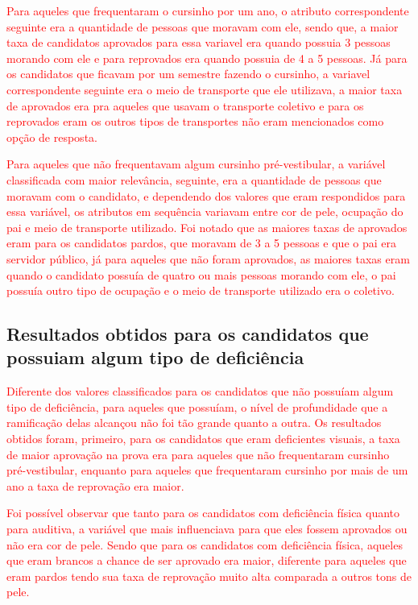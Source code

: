 \par
\textcolor{red}{Para aqueles que frequentaram o cursinho por um ano, o atributo correspondente seguinte era a quantidade de pessoas que moravam com ele, sendo que, a maior taxa de candidatos aprovados para essa variavel era quando possuia 3 pessoas morando com ele e para reprovados era quando possuia de 4 a 5 pessoas. Já para os candidatos que ficavam por um semestre fazendo o cursinho, a variavel correspondente seguinte era o meio de transporte que ele utilizava, a maior taxa de aprovados era pra aqueles que usavam o transporte coletivo e para os reprovados eram os outros tipos de transportes não eram mencionados como opção de resposta.}

\par
\textcolor{red}{Para aqueles que não frequentavam algum cursinho pré-vestibular, a variável classificada com maior relevância, seguinte, era a quantidade de pessoas que moravam com o candidato, e dependendo dos valores que eram respondidos para essa variável, os atributos em sequência variavam entre cor de pele, ocupação do pai e meio de transporte utilizado. Foi notado que as maiores taxas de aprovados eram para os candidatos pardos, que moravam de 3 a 5 pessoas e que o pai era servidor público, já para aqueles que não foram aprovados, as maiores taxas eram quando o candidato possuía de quatro ou mais pessoas morando com ele, o pai possuía outro tipo de ocupação e o meio de transporte utilizado era o coletivo.}


\subsection{Resultados obtidos para os candidatos que possuiam algum tipo de deficiência}


\par
\textcolor{red}{Diferente dos valores classificados para os candidatos que não possuíam algum tipo de deficiência, para aqueles que possuíam, o nível de profundidade que a ramificação delas alcançou não foi tão grande quanto a outra. Os resultados obtidos foram, primeiro, para os candidatos que eram deficientes visuais, a taxa de maior aprovação na prova era para aqueles que não frequentaram cursinho pré-vestibular, enquanto para aqueles que frequentaram cursinho por mais de um ano a taxa de reprovação era maior.}

\par
\textcolor{red}{Foi possível observar que tanto para os candidatos com deficiência física quanto para auditiva, a variável que mais influenciava para que eles fossem aprovados ou não era cor de pele. Sendo que para os candidatos com deficiência física, aqueles que eram brancos a chance de ser aprovado era maior, diferente para aqueles que eram pardos tendo sua taxa de reprovação muito alta comparada a outros tons de pele.}

